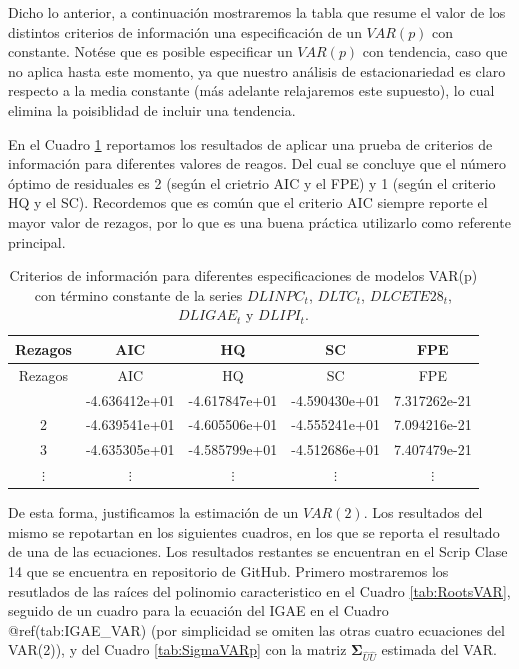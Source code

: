 \documentclass[
]{book}
\begin{document}
Dicho lo anterior, a continuación mostraremos la tabla que resume el valor de los distintos criterios de información una especificación de un \(VAR(p)\) con constante. Notése que es posible especificar un \(VAR(p)\) con tendencia, caso que no aplica hasta este momento, ya que nuestro análisis de estacionariedad es claro respecto a la media constante (más adelante relajaremos este supuesto), lo cual elimina la poisiblidad de incluir una tendencia.

En el Cuadro \ref{tab:SelectVAR} reportamos los resultados de aplicar una prueba de criterios de información para diferentes valores de reagos. Del cual se concluye que el número óptimo de residuales es 2 (según el crietrio AIC y el FPE) y 1 (según el criterio HQ y el SC). Recordemos que es común que el criterio AIC siempre reporte el mayor valor de rezagos, por lo que es una buena práctica utilizarlo como referente principal.

\begin{longtable}[]{@{}ccccc@{}}
\caption{\label{tab:SelectVAR} Criterios de información para diferentes especificaciones de modelos VAR(p) con término constante de la series \(DLINPC_t\), \(DLTC_t\), \(DLCETE28_t\), \(DLIGAE_t\) y \(DLIPI_t\).}\tabularnewline
\toprule\noalign{}
Rezagos & AIC & HQ & SC & FPE \\
\midrule\noalign{}
\endfirsthead
\toprule\noalign{}
Rezagos & AIC & HQ & SC & FPE \\
\midrule\noalign{}
\endhead
\bottomrule\noalign{}
\endlastfoot
1 & -4.636412e+01 & -4.617847e+01 & -4.590430e+01 & 7.317262e-21 \\
2 & -4.639541e+01 & -4.605506e+01 & -4.555241e+01 & 7.094216e-21 \\
3 & -4.635305e+01 & -4.585799e+01 & -4.512686e+01 & 7.407479e-21 \\
\(\vdots\) & \(\vdots\) & \(\vdots\) & \(\vdots\) & \(\vdots\) \\
\end{longtable}

De esta forma, justificamos la estimación de un \(VAR(2)\). Los resultados del mismo se repotartan en los siguientes cuadros, en los que se reporta el resultado de una de las ecuaciones. Los resultados restantes se encuentran en el Scrip Clase 14 que se encuentra en repositorio de GitHub. Primero mostraremos los resutlados de las raíces del polinomio caracteristico en el Cuadro \ref{tab:RootsVAR}, seguido de un cuadro para la ecuación del IGAE en el Cuadro @ref(tab:IGAE\_VAR) (por simplicidad se omiten las otras cuatro ecuaciones del VAR(2)), y del Cuadro \ref{tab:SigmaVARp} con la matriz \(\mathbf{\Sigma}_{\hat{U}\hat{U}}\) estimada del VAR.
\end{document}
